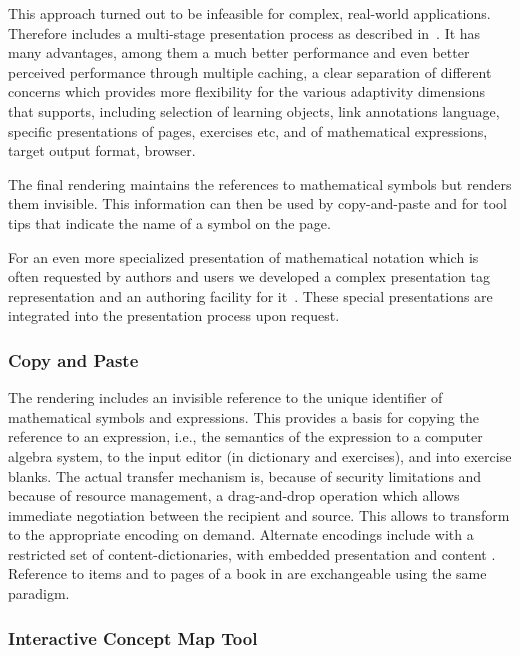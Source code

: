 This approach turned out to be infeasible for complex, real-world applications. Therefore
{\activemath} includes a multi-stage presentation process as described
in~\cite{Ullrichetal-Presentation-ICALT04}. It has many advantages, among them a much
better performance and even better perceived performance through multiple caching, a clear
separation of different concerns which provides more flexibility for the various
adaptivity dimensions that {\activemath} supports, including selection of learning
objects, link annotations language, specific presentations of pages, exercises etc, and of
mathematical expressions, target output format, browser.

The final rendering maintains the references to mathematical symbols but renders them
invisible. This information can then be used by copy-and-paste and for tool tips that
indicate the name of a symbol on the page.

For an even more specialized presentation of mathematical notation which is often
requested by authors and users we developed a complex presentation tag representation and
an authoring facility for it~\cite{Manzooretal-Notations-MKM-2005}. These special
presentations are integrated into the presentation process upon request.

\subsubsection{Copy and Paste}

The rendering includes an invisible reference to the unique identifier of mathematical
symbols and expressions. This provides a basis for copying the reference to an {\openmath}
expression, i.e., the semantics of the expression to a computer algebra system, to the
input editor (in dictionary and exercises), and into exercise blanks.
The actual transfer mechanism is, because of security limitations and
because of resource management, a drag-and-drop operation which allows
immediate negotiation between the recipient and source. This allows
to transform to the appropriate encoding on demand.
Alternate encodings include {\openmath} with a restricted set of content-dictionaries, 
{\html} with embedded presentation and content {\mathml}.
Reference to {\omdoc} items and to pages of a book in {\activemath} are
exchangeable using the same paradigm.

\subsubsection{Interactive Concept Map Tool {}}

